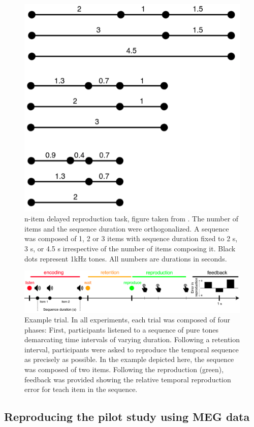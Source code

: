 \begin{figure}
   \centering
   \includegraphics[width=0.5\linewidth]{images_report/paradigme_experiment_2.png}
   \caption[List of possible sequences.]%
   {n-item delayed reproduction task, figure taken from \cite{herbst2021abstracting}. The number of items and the sequence duration were orthogonalized. A sequence was composed of 1, 2 or 3 items with sequence duration fixed to 2 s, 3 s, or 4.5 s irrespective of the number of items composing it. Black dots represent 1kHz tones. All numbers are durations in seconds.}
   \label{fig:experiment_2}
\end{figure}

\begin{figure}
   \includegraphics[width=1.\linewidth]{images_report/encoding_retention_reproduction.png}
   \caption[Example trial]%
   {Example trial. In all experiments, each trial was composed of four phases: First, participants listened to a sequence of pure tones demarcating time intervals of varying duration. Following a retention interval, participants were asked to reproduce the temporal sequence as precisely as possible. In the example depicted here, the sequence was composed of two items. Following the reproduction (green), feedback was provided showing the relative temporal reproduction error for teach item in the sequence.}
   \label{paradigm}
\end{figure}


\subsection{Reproducing the pilot study using MEG data}

